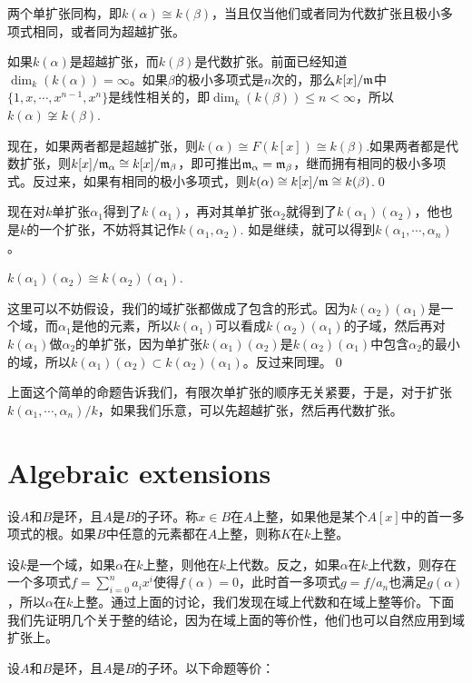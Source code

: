 \pro 两个单扩张同构，即$k(\alpha)\cong k(\beta)$，当且仅当他们或者同为代数扩张且极小多项式相同，或者同为超越扩张。


\proof 如果$k(\alpha)$是超越扩张，而$k(\beta)$是代数扩张。前面已经知道$\dim_k(k(\alpha))=\infty$。如果$\beta$的极小多项式是$n$次的，那么$k[x]/\mathfrak{m}$中$\{1,x,\cdots,x^{n-1},x^n\}$是线性相关的，即$\dim_k(k(\beta))\leq n<\infty$，所以$k(\alpha)\not\cong k(\beta)$.

	现在，如果两者都是超越扩张，则$k(\alpha)\cong F(k[x])\cong k(\beta)$.如果两者都是代数扩张，则$k[x]/\mathfrak{m}_\alpha\cong k[x]/\mathfrak{m}_\beta$，即可推出$\mathfrak{m}_\alpha=\mathfrak{m}_\beta$，继而拥有相同的极小多项式。反过来，如果有相同的极小多项式，则$k(\alpha)\cong k[x]/\mathfrak{m}\cong k(\beta)$.\qed

现在对$k$单扩张$\alpha_1$得到了$k(\alpha_1)$，再对其单扩张$\alpha_2$就得到了$k(\alpha_1)(\alpha_2)$，他也是$k$的一个扩张，不妨将其记作$k(\alpha_1, \alpha_2)$. 如是继续，就可以得到$k(\alpha_1,\cdots,\alpha_n)$。

\pro  $k(\alpha_1)(\alpha_2)\cong k(\alpha_2)(\alpha_1)$.

\proof 这里可以不妨假设，我们的域扩张都做成了包含的形式。因为$k(\alpha_2)(\alpha_1)$是一个域，而$\alpha_1$是他的元素，所以$k(\alpha_1)$可以看成$k(\alpha_2)(\alpha_1)$的子域，然后再对$k(\alpha_1)$做$\alpha_2$的单扩张，因为单扩张$k(\alpha_1)(\alpha_2)$是$k(\alpha_2)(\alpha_1)$中包含$\alpha_2$的最小的域，所以$k(\alpha_1)(\alpha_2)\subset k(\alpha_2)(\alpha_1)$。反过来同理。\qed

上面这个简单的命题告诉我们，有限次单扩张的顺序无关紧要，于是，对于扩张$k(\alpha_1,\cdots,\alpha_n)/k$，如果我们乐意，可以先超越扩张，然后再代数扩张。

\section{Algebraic extensions}

\para 设$A$和$B$是环，且$A$是$B$的子环。称$x\in B$在$A$上整，如果他是某个$A[x]$中的首一多项式的根。如果$B$中任意的元素都在$A$上整，则称$K$在$k$上整。

设$k$是一个域，如果$\alpha$在$k$上整，则他在$k$上代数。反之，如果$\alpha$在$k$上代数，则存在一个多项式$f=\sum_{i=0}^na_ix^i$使得$f(\alpha)=0$，此时首一多项式$g=f/a_n$也满足$g(\alpha)$，所以$\alpha$在$k$上整。通过上面的讨论，我们发现在域上代数和在域上整等价。下面我们先证明几个关于整的结论，因为在域上面的等价性，他们也可以自然应用到域扩张上。

\pro 设$A$和$B$是环，且$A$是$B$的子环。以下命题等价：

